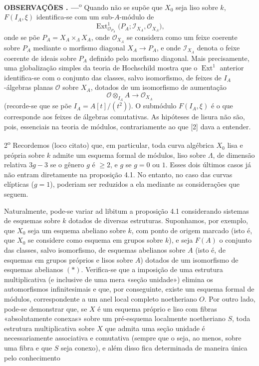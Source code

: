 \documentclass[11pt,twoside,openany]{book}
\numberwithin{equation}{section}
\theoremstyle{plain}
\theoremstyle{definition}
\theoremstyle{remark}
\newcommand{\result}[2]{%
  \par\medskip\noindent\textbf{#1%
  \if\relax\detokenize{#2}\relax\else\space#2\fi. ---}\enspace
}
\begin{document}
\result{OBSERVAÇÕES}{} 1\textsuperscript{o} Quando não se supõe que $X_0$ seja
liso sobre $k$, $F(I_A,\xi)$ identifica-se com um sub-$A$-módulo de
\[
  \operatorname{Ext}^1_{\mathcal O_{P_A}}
  \bigl(P_A;\mathcal I_{X_A},\mathcal O_{X_A}\bigr),
\]
onde se põe $P_A=X_A\times_\Lambda X_A$, onde $\mathcal O_{X_A}$ se
considera como um feixe coerente sobre $P_A$ mediante o morfismo diagonal
$X_A\longrightarrow P_A$, e onde $\mathcal I_{X_A}$ denota o feixe coerente
de ideais sobre $P_A$ definido pelo morfismo diagonal. Mais precisamente,
uma globalização simples da teoria de Hochschild mostra que o
$\operatorname{Ext}^1$ anterior identifica-se com o conjunto das classes,
salvo isomorfismo, de feixes de $I_A$-álgebras planas $\mathcal O$ sobre $X_A$,
dotados de um isomorfismo de aumentação
\[
  \mathcal O\otimes_{I_A}A\longrightarrow\mathcal O_{X_A}
\]
(recorde-se que se põe $I_A=A[t]/(t^2)$). O submódulo $F(I_A,\xi)$ é o
que corresponde aos feixes de álgebras comutativas. As hipóteses de lisura
não são, pois, essenciais na teoria de módulos, contrariamente ao que [2]
dava a entender.

2\textsuperscript{o} Recordemos (loco citato) que, em particular, toda curva
algébrica $X_0$ lisa e própria sobre $k$ admite um esquema formal de módulos,
liso sobre $\Lambda$, de dimensão relativa $3g-3$ se o gênero $g$ é
$\geq2$, e $g$ se $g=0$ ou $1$. Esses dois últimos casos já não entram diretamente
na proposição 4.1. No entanto, no caso das curvas elípticas
($g=1$), poderiam ser reduzidos a ela mediante as considerações que seguem.

Naturalmente, pode-se variar ad libitum a proposição 4.1 considerando
sistemas de esquemas sobre $k$ dotados de diversas estruturas. Suponhamos,
por exemplo, que $X_0$ seja um esquema abeliano sobre $k$, com ponto de origem
marcado (isto é, que $X_0$ se considere como esquema em grupos sobre $k$), e
seja $F(A)$ o conjunto das classes, salvo isomorfismo, de esquemas abelianos
sobre $A$ (isto é, de esquemas em grupos próprios e lisos sobre $A$) dotados
de um isomorfismo de esquemas abelianos $(*)$. Verifica-se que a imposição
de uma estrutura multiplicativa (e inclusive de uma mera «seção unidade»)
elimina os automorfismos infinitesimais e que, por conseguinte, existe um
esquema formal de módulos, correspondente a um anel local completo
noetheriano $O$. Por outro lado, pode-se demonstrar que, se $X$ é um esquema
próprio e liso com fibras «absolutamente conexas» sobre um pré-esquema localmente
noetheriano $S$, toda estrutura multiplicativa sobre $X$ que admita uma
seção unidade é necessariamente associativa e comutativa (sempre que o seja,
ao menos, sobre uma fibra e que $S$ seja conexo), e além disso fica determinada de
maneira única pelo conhecimento
\end{document}
